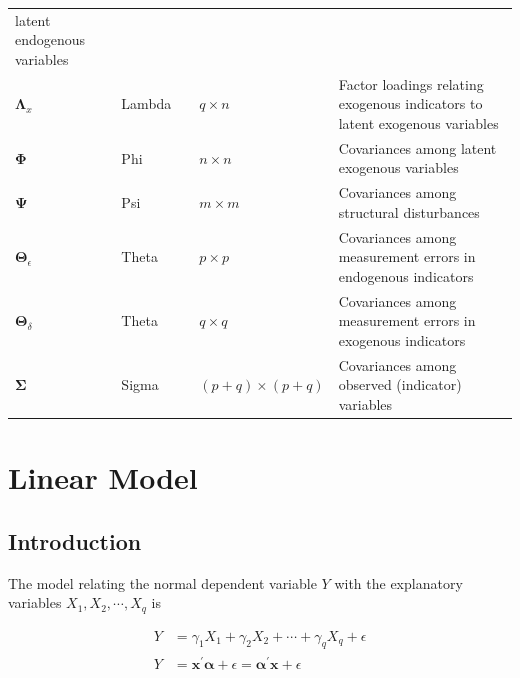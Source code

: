 \begin{table}[H]
\begin{tabular}{llllp{6.0cm}}
{latent endogenous variables}\tabularnewline
{\footnotesize{}$\bm{\Lambda}_{x}$} & {\footnotesize{}Lambda} &  & {\footnotesize{}$q\times n$} & {\footnotesize{}Factor loadings relating exogenous indicators to latent
exogenous variables}\tabularnewline
{\footnotesize{}$\bm{\Phi}$ } & {\footnotesize{}Phi} &  & {\footnotesize{}$n\times n$} & {\footnotesize{}Covariances among latent exogenous variables}\tabularnewline
{\footnotesize{}$\bm{\Psi}$} & {\footnotesize{}Psi} &  & {\footnotesize{}$m\times m$} & {\footnotesize{}Covariances among structural disturbances}\tabularnewline
{\footnotesize{}$\bm{\Theta}_{\epsilon}$} & {\footnotesize{}Theta} &  & {\footnotesize{}$p\times p$} & {\footnotesize{}Covariances among measurement errors in endogenous
indicators}\tabularnewline
{\footnotesize{}$\bm{\Theta}_{\delta}$} & {\footnotesize{}Theta} &  & {\footnotesize{}$q\times q$} & {\footnotesize{}Covariances among measurement errors in exogenous
indicators}\tabularnewline
{\footnotesize{}$\bm{\Sigma}$} & {\footnotesize{}Sigma} &  & {\footnotesize{}$\left(p+q\right)\times\left(p+q\right)$} & {\footnotesize{}Covariances among observed (indicator) variables}\tabularnewline
\hline 
\end{tabular}
\end{table}

\hypertarget{LM}{%
\chapter{Linear Model}\label{LM}}

\hypertarget{introduction}{%
\section{Introduction}\label{introduction}}

The model relating the normal dependent variable \(Y\) with the explanatory variables \(X_1, X_2, \cdots, X_q\) is

\begin{align}
Y & = \gamma_{1}X_{1}+\gamma_{2}X_{2}+\cdots+\gamma_{q}X_{q}+\epsilon \label{eq:LM1}\\
Y & =\mathbf{x}^{\prime}\bm{\alpha}+\epsilon=\bm{\alpha}^{\prime}\mathbf{x}+\epsilon \label{eq:LM2}
\end{align}

